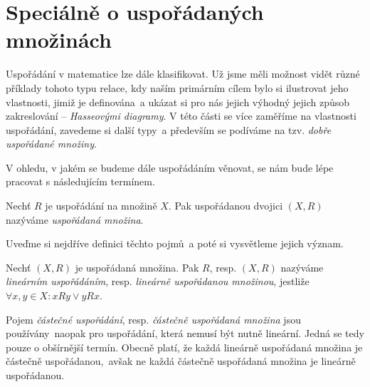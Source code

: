 \section{Speciálně o uspořádaných množinách}\label{sec:specialne_o_usporadanych_mozinach}
Uspořádání v matematice lze dále klasifikovat. Už jsme měli možnost vidět různé příklady tohoto typu relace, kdy naším primárním cílem bylo si ilustrovat jeho vlastnosti, jimiž je definována~a ukázat si pro nás jejich výhodný jejich způsob zakreslování -- \emph{Hasseovými diagramy}. V této části se více zaměříme na vlastnosti uspořádání, zavedeme si další typy~a především se podíváme na tzv. \emph{dobře uspořádané množiny}.\par
V ohledu, v jakém se budeme dále uspořádáním věnovat, se nám bude lépe pracovat s následujícím termínem.
\begin{definition}
    Nechť $R$ je uspořádání na množině $X$. Pak uspořádanou dvojici $(X,R)$ nazýváme \emph{uspořádaná množina}.
\end{definition}
Uveďme si nejdříve definici těchto pojmů~a poté si vysvětleme jejich význam.
\begin{definition}
    Nechť $(X,R)$ je uspořádaná množina. Pak $R$, resp. $(X,R)$ nazýváme \emph{lineárním uspořádáním}, resp. \emph{lineárně uspořádanou množinou}, jestliže $\forall x,y\in X: xRy \lor yRx$.
\end{definition}
Pojem \emph{částečné uspořádání}, resp. \emph{částečně uspořádaná množina} jsou používány~naopak pro uspořádání, která nemusí být nutně lineární. Jedná se tedy pouze o obšírnější termín. Obecně platí, že každá lineárně uspořádaná množina je částečně uspořádanou,~avšak ne každá částečně uspořádaná množina je lineárně uspořádanou.
